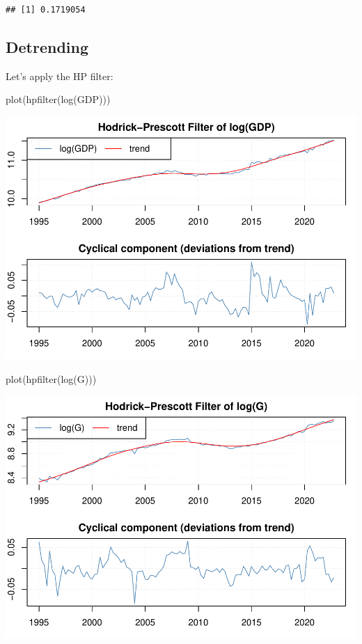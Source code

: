 \documentclass[
]{article}
\newenvironment{Shaded}{\begin{snugshade}}{\end{snugshade}}
\newcommand{\FunctionTok}[1]{\textcolor[rgb]{0.00,0.00,0.00}{#1}}
\newcommand{\NormalTok}[1]{#1}
\begin{document}
\begin{verbatim}
## [1] 0.1719054
\end{verbatim}

\hypertarget{detrending}{%
\subsection{Detrending}\label{detrending}}

Let's apply the HP filter:

\begin{Shaded}
\begin{Highlighting}[]
\FunctionTok{plot}\NormalTok{(}\FunctionTok{hpfilter}\NormalTok{(}\FunctionTok{log}\NormalTok{(GDP)))}
\end{Highlighting}
\end{Shaded}

\includegraphics{AdvMacro2_Assignment1_files/figure-latex/unnamed-chunk-4-1.pdf}

\begin{Shaded}
\begin{Highlighting}[]
\FunctionTok{plot}\NormalTok{(}\FunctionTok{hpfilter}\NormalTok{(}\FunctionTok{log}\NormalTok{(G)))}
\end{Highlighting}
\end{Shaded}

\includegraphics{AdvMacro2_Assignment1_files/figure-latex/unnamed-chunk-4-2.pdf}
\end{document}
